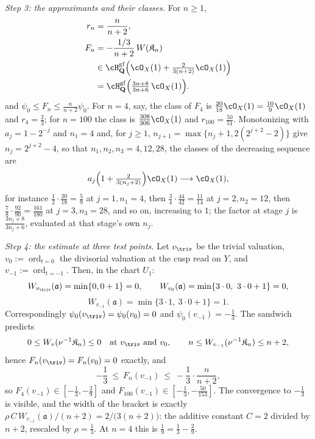 \begin{example}
\emph{Step 3: the approximants and their classes.}  For $n\ge1$,
\[
 \begin{aligned}
 r_n&=\frac n{n+2},\\
 F_n&=-\frac{1/3}{n+2}\,W(\mathfrak K_n)\\
 &\in\cH^{\mathrm{gf}}_{\mathbf Q}
   \Bigl(\cO_X(1)+\tfrac{2}{3(n+2)}\cO_X(1)\Bigr)\\
 &=\cH^{\mathrm{gf}}_{\mathbf Q}
   \Bigl(\tfrac{3n+8}{3n+6}\,\cO_X(1)\Bigr).
 \end{aligned}
\]
and $\psi_0\le F_n\le\frac n{n+2}\psi_0$.  For $n=4$, say, the class of
$F_4$ is $\frac{20}{18}\cO_X(1)=\frac{10}9\cO_X(1)$ and
$r_4=\frac23$; for $n=100$ the class is $\frac{308}{306}\cO_X(1)$ and
$r_{100}=\frac{50}{51}$.  Monotonizing with $a_j=1-2^{-j}$ and
$n_1=4$ and, for $j\ge1$,
$n_{j+1}=\max\{n_j+1,2(2^{j+2}-2)\}$ give
$n_j=2^{j+2}-4$, so that $n_1,n_2,n_3=4,12,28$,
the classes of the decreasing sequence are
\[
 a_j\Bigl(1+\tfrac2{3(n_j+2)}\Bigr)\cO_X(1)
 \longrightarrow\cO_X(1),
\]
for instance $\tfrac12\cdot\tfrac{20}{18}=\tfrac59$ at $j=1,n_1=4$,
then $\tfrac34\cdot\tfrac{44}{42}=\tfrac{11}{14}$ at $j=2,n_2=12$, then
$\tfrac78\cdot\tfrac{92}{90}=\tfrac{161}{180}$ at $j=3,n_3=28$, and so
on, increasing to $1$; the factor at stage $j$ is
$\tfrac{3n_j+8}{3n_j+6}$, evaluated at that stage's own $n_j$.

\emph{Step 4: the estimate at three test points.}  Let $v_\triv$ be the
trivial valuation, $v_0:=\operatorname{ord}_{t=0}$ the divisorial
valuation at the cusp read on $Y$, and $v_{-1}:=\operatorname{ord}_{t=-1}$.
Then, in the chart $U_1$:
\[
 W_{v_\triv}(\mathfrak a)=\min\{0,0+1\}=0,
 \qquad
 W_{v_0}(\mathfrak a)=\min\{3\cdot0,\ 3\cdot0+1\}=0,
\]
\[
 W_{v_{-1}}(\mathfrak a)=\min\{3\cdot1,\ 3\cdot0+1\}=1 .
\]
Correspondingly $\psi_0(v_\triv)=\psi_0(v_0)=0$ and
$\psi_0(v_{-1})=-\tfrac13$.  The sandwich predicts
\[
 0\le W_{v}(\nu^{-1}\mathfrak K_n)\le0
 \quad\text{at }v_\triv\text{ and }v_0,
 \qquad
 n\le W_{v_{-1}}(\nu^{-1}\mathfrak K_n)\le n+2,
\]
hence $F_n(v_\triv)=F_n(v_0)=0$ exactly, and
\[
 -\frac13\ \le\ F_n(v_{-1})\ \le\ -\frac13\cdot\frac n{n+2},
\]
so $F_4(v_{-1})\in[-\tfrac13,-\tfrac29]$ and
$F_{100}(v_{-1})\in[-\tfrac13,-\tfrac{50}{153}]$.  The convergence to
$-\tfrac13$ is visible, and the width of the bracket is exactly
$\rho\,C\,W_{v_{-1}}(\mathfrak a)/(n+2)=2/\bigl(3(n+2)\bigr)$: the additive
constant $C=2$ divided by $n+2$, rescaled by $\rho=\tfrac13$.  At
$n=4$ this is $\tfrac19=\tfrac13-\tfrac29$.


\end{example}
